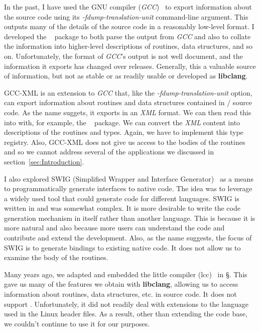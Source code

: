 \documentclass[article]{jss}
\def\C{\proglang{C}}
\def\perl{\proglang{PERL}}
\def\Cpp{\proglang{C$++$}}
\def\R{\proglang{R}}
\def\Rpkg#1{\pkg{#1}}
\def\libclang{\textbf{libclang}}
\def\gcc{\textit{GCC}}
\def\XML{\textit{XML}}
\def\ShFlag#1{\textit{#1}}
\begin{document}
In the past, I have used the GNU compiler (\gcc)~\cite{bib:GCC} to
export information about the source code using its
\ShFlag{-fdump-translation-unit} command-line argument.  This outputs
many of the details of the source code in a reasonably low-level
format. I developed the \Rpkg{RGCCTranslationUnit}~\cite{bib:RGCCTU}
package to both parse the output from \gcc{} and also to collate the
information into higher-level descriptions of routines, data
structures, and so on.  Unfortunately, the format of \gcc's output is
not well document, and the information it exports has changed over
releases.  Generally, this a valuable source of information, but not
as stable or as readily usable or developed as \libclang.

GCC-XML is an extension to \gcc{} that, like the
\ShFlag{-fdump-translation-unit} option, can export information about
routines and data structures contained in \C/\Cpp{} source code.  As
the name suggets, it exports in an \XML{} format.  We can then read
this into \R{} with, for example, the \Rpkg{XML}~\cite{bib:RSXML}
package.  We can convert the \XML{} content into descriptions of the
routines and types.  Again, we have to implement this type registry.
Also, GCC-XML does not give us access to the bodies of the routines
and so we cannot address several of the applications we discussed in
section~\ref{sec:Introduction}.


I also explored SWIG (Simplified Wrapper and Interface
Generator)~\cite{bib:SWIG} as a means to programmatically generate
interfaces to native code. The idea was to leverage a widely used tool
that could generate code for different languages.  SWIG is written in
\perl{} and was somewhat complex. It is more desirable to write the
code generation mechanism in \R{} itself rather than another language.
This is because it is more natural and also because more users can
understand the code and contribute and extend the development.  Also,
as the name suggests, the focus of SWIG is to generate bindings to
existing native code.  It does not allow us to examine the body of the
routines.


Many years ago, we adapted and embedded the little \C{} compiler
(lcc)~\cite{bib:lcc} in \S.  This gave us many of the features we
obtain with \libclang, allowing us to access information about
routines, data structures, etc. in source code.  It does not support
\Cpp. Unfortunately, it did not readily deal with extensions to the
\C{} language used in the Linux header files. As a result, other than
extending the code base, we couldn't continue to use it for our
purposes.
 
\end{document}

